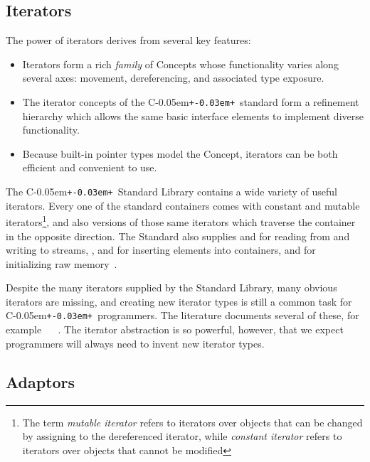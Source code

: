 \documentclass{netobjectdays}
\newcommand{\Cpp}{C\kern-0.05em\texttt{+\kern-0.03em+}}
\begin{document}
\subsection{Iterators}

The power of iterators derives from several key
features:\begin{itemize}

 \item Iterators form a rich \emph{family} of Concepts whose
functionality varies along several axes: movement, dereferencing, and
associated type exposure.

 \item The iterator concepts of the \Cpp\
standard form a refinement hierarchy which allows the same basic
interface elements to implement diverse functionality.

 \item Because
built-in pointer types model the 
Concept, iterators can be both efficient and convenient to use.

\end{itemize}

The \Cpp\ Standard Library contains a wide variety of useful
iterators. Every one of the standard containers comes with constant
and mutable iterators\footnote{The term \emph{mutable iterator} refers
to iterators over objects that can be changed by assigning to the
dereferenced iterator, while \emph{constant iterator} refers to
iterators over objects that cannot be modified}, and also
 versions of those same iterators which traverse the
container in the opposite direction. The Standard also supplies
 and  for reading
from and writing to streams, \code{insert\_iterator},
 and  for
inserting elements into containers, and
 for initializing raw
memory~\cite{iso98:_cpp_final_draft_standard}.

Despite the many iterators supplied by the Standard Library, many
obvious iterators are missing, and creating new iterator types is
still a common task for \Cpp\ programmers. The literature documents
several of these, for example
~\cite{austern99:_gener_progr_stl}
~\cite{koenig97:_rumin_cpp}. The iterator
abstraction is so powerful, however, that we expect programmers will
always need to invent new iterator types.

\subsection{Adaptors}
\end{document}
